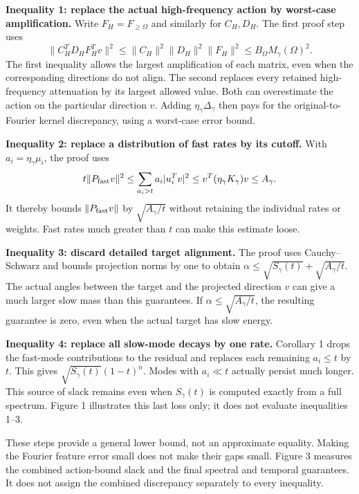 \documentclass[11pt]{article}
\theoremstyle{definition}
\begin{document}
\textbf{Inequality 1: replace the actual high-frequency action by worst-case
amplification.} Write $F_H=F_{\ge\Omega}$ and similarly for $C_H,D_H$.
The first proof step uses
\begin{equation*}
 \|C_H^TD_HF_H^Tv\|^2
 \le\|C_H\|^2\|D_H\|^2\|F_H\|^2
 \le B_\Omega M_\gamma(\Omega)^2.
\end{equation*}
The first inequality allows the largest amplification of each matrix, even
when the corresponding directions do not align. The second replaces every
retained high-frequency attenuation by its largest allowed value. Both can
overestimate the action on the particular direction $v$. Adding
$\eta_\gamma\Delta_\gamma$ then pays for the original-to-Fourier kernel
discrepancy, using a worst-case error bound.

\textbf{Inequality 2: replace a distribution of fast rates by its cutoff.}
With $a_i=\eta_\gamma\mu_i$, the proof uses
\begin{equation*}
 t\|P_{\rm fast}v\|^2
 \le\sum_{a_i>t}a_i|u_i^Tv|^2
 \le v^T(\eta_\gamma K_\gamma)v
 \le A_\gamma.
\end{equation*}
It thereby bounds $\|P_{\rm fast}v\|$ by $\sqrt{A_\gamma/t}$ without retaining
the individual rates or weights. Fast rates much greater than $t$ can make
this estimate loose.

\textbf{Inequality 3: discard detailed target alignment.}
The proof uses Cauchy--Schwarz and bounds projection norms by one to obtain
$\alpha\le\sqrt{S_\gamma(t)}+\sqrt{A_\gamma/t}$. The actual angles between
the target and the projected direction $v$ can give a much larger slow mass
than this guarantees. If $\alpha\le\sqrt{A_\gamma/t}$, the resulting guarantee
is zero, even when the actual target has slow energy.

\textbf{Inequality 4: replace all slow-mode decays by one rate.}
Corollary 1 drops the fast-mode contributions to the residual and replaces
each remaining $a_i\le t$ by $t$. This gives
$\sqrt{S_\gamma(t)}(1-t)^n$. Modes with $a_i\ll t$ actually persist much
longer. This source of slack remains even when $S_\gamma(t)$ is computed
exactly from a full spectrum. Figure 1 illustrates this last loss only;
it does not evaluate inequalities 1--3.

These steps provide a general lower bound, not an approximate equality.
Making the Fourier feature error small does not make their gaps small.
Figure 3 measures the combined action-bound slack and the final spectral and
temporal guarantees. It does not assign the combined discrepancy separately
to every inequality.
\end{document}
